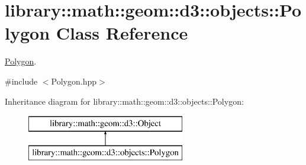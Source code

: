 \hypertarget{classlibrary_1_1math_1_1geom_1_1d3_1_1objects_1_1_polygon}{}\section{library\+:\+:math\+:\+:geom\+:\+:d3\+:\+:objects\+:\+:Polygon Class Reference}
\label{classlibrary_1_1math_1_1geom_1_1d3_1_1objects_1_1_polygon}


\hyperlink{classlibrary_1_1math_1_1geom_1_1d3_1_1objects_1_1_polygon}{Polygon}.  




{\ttfamily \#include $<$Polygon.\+hpp$>$}

Inheritance diagram for library\+:\+:math\+:\+:geom\+:\+:d3\+:\+:objects\+:\+:Polygon\+:\begin{figure}[H]
\begin{center}
\leavevmode
\includegraphics[height=2.000000cm]{classlibrary_1_1math_1_1geom_1_1d3_1_1objects_1_1_polygon}
\end{center}
\end{figure}
